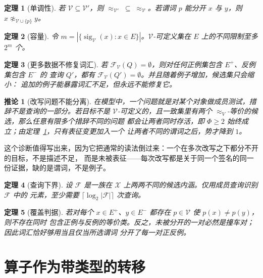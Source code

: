 \documentclass[11pt]{ctexart}
\newtheorem{theorem}{定理}
\newtheorem{corollary}{推论}
\newcommand{\sig}{\operatorname{sig}}
\newcommand{\Indist}{\approx_{V}}
\newcommand{\Vocab}{\mathcal{V}}
\newcommand{\dom}{\mathcal{X}}
\newcommand{\Epos}{E^{+}}
\newcommand{\Eneg}{E^{-}}
\begin{document}
\begin{theorem}[单调性]\label{thm:mono}
若 $\Vocab \subseteq \Vocab'$，则 $\approx_{\Vocab'} \;\subseteq\; \approx_{\Vocab}$。若谓词 $p$
能分开 $x$ 与 $y$，则 $x \not\approx_{\Vocab \cup \{p\}} y$。
\end{theorem}

\begin{theorem}[容量]\label{thm:capacity}
令 $m = |\{\sig_{\Vocab}(x) : x \in E\}|$。$\Vocab$-可定义集在 $E$ 上的不同限制至多
$2^{m}$ 个。
\end{theorem}

\begin{theorem}[更多数据不修复词汇]\label{thm:monodata}
若 $\mathcal{F}_{\Vocab}(Q) = \emptyset$，则对任何正例集包含 $\Epos$、反例集包含 $\Eneg$ 的
查询 $Q'$，都有 $\mathcal{F}_{\Vocab}(Q') = \emptyset$。并且随着例子增加，候选集只会缩小：
追加的例子能暴露词汇不足，但永远不能修复它。
\end{theorem}

\begin{corollary}[改写问题不能分离]\label{cor:rephrase}
在模型中，一个问题就是对某个对象做成员测试，措辞不是查询的一部分。若目标不是
$\Vocab$-可定义的，且一致集里有两个 $\Indist$-等价的候选，那么任意有限多个措辞不同的问题
都会让两者同时存活，即 $\Phi \ge 2$ 始终成立；由定理~\ref{thm:mono}，只有表征变更加入一个
让两者不同的谓词之后，势才降到 $1$。
\end{corollary}

这个诊断值得写出来，因为它把通常的读法倒过来：一个在多次改写之下都分不开的目标，不是描述不足，
而是未被表征——每次改写都是关于同一个签名的同一份证据，缺的是谓词，不是例子。
\begin{theorem}[查询下界]\label{thm:lower}
设 $\mathcal{F}$ 是一族在 $\dom$ 上两两不同的候选内涵。仅用成员查询识别 $\mathcal{F}$ 中的
元素，至少需要 $\lceil \log_2 |\mathcal{F}| \rceil$ 次查询。
\end{theorem}

\begin{theorem}[覆盖判据]\label{thm:cover}
若对每个 $x \in \Epos$、$y \in \Eneg$ 都存在 $p \in \Vocab$ 使 $p(x) \neq p(y)$，则不存在同时
包含正例与反例的等价类。反之，未被分开的一对必然是撞车对；因此词汇恰好够用当且仅当所选谓词
分开了每一对正反例。
\end{theorem}

\section{算子作为带类型的转移}\label{sec:operators}
\end{document}
